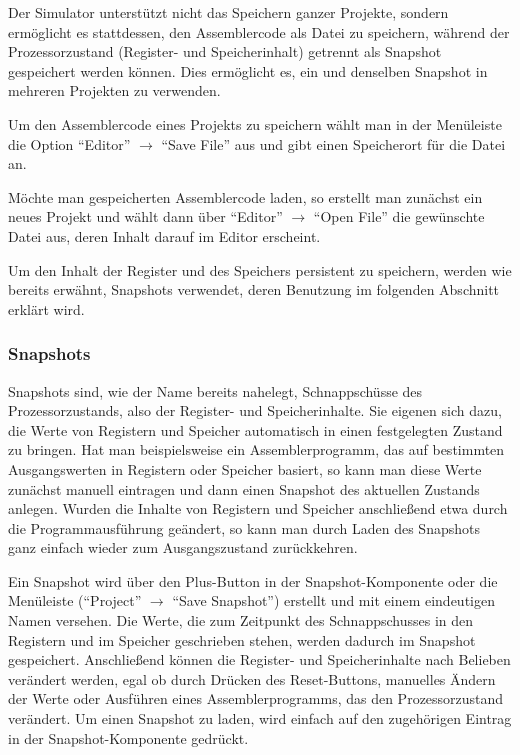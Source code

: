 Der Simulator unterstützt nicht das Speichern ganzer Projekte, sondern
ermöglicht es stattdessen, den Assemblercode als Datei zu speichern, während der
Prozessorzustand (Register- und Speicherinhalt) getrennt als Snapshot
gespeichert werden können. Dies ermöglicht es, ein und denselben Snapshot in
mehreren Projekten zu verwenden.

Um den Assemblercode eines Projekts zu speichern wählt man in der Menüleiste die
Option ``Editor'' $\rightarrow$ ``Save File'' aus und gibt einen Speicherort für
die Datei an.

Möchte man gespeicherten Assemblercode laden, so erstellt man zunächst ein neues
Projekt und wählt dann über ``Editor'' $\rightarrow$ ``Open File'' die
gewünschte Datei aus, deren Inhalt darauf im Editor erscheint.

Um den Inhalt der Register und des Speichers persistent zu speichern, werden wie
bereits erwähnt, Snapshots verwendet, deren Benutzung im folgenden Abschnitt
erklärt wird.

\subsubsection{Snapshots}

Snapshots sind, wie der Name bereits nahelegt, Schnappschüsse des
Prozessorzustands, also der Register- und Speicherinhalte. Sie eigenen sich
dazu, die Werte von Registern und Speicher automatisch in einen festgelegten
Zustand zu bringen. Hat man beispielsweise ein Assemblerprogramm, das auf
bestimmten Ausgangswerten in Registern oder Speicher basiert, so kann man diese
Werte zunächst manuell eintragen und dann einen Snapshot des aktuellen Zustands
anlegen. Wurden die Inhalte von Registern und Speicher anschließend etwa durch
die Programmausführung geändert, so kann man durch Laden des Snapshots ganz
einfach wieder zum Ausgangszustand zurückkehren.

Ein Snapshot wird über den Plus-Button in der Snapshot-Komponente oder die
Menüleiste (``Project'' $\rightarrow$ ``Save Snapshot'') erstellt und mit einem
eindeutigen Namen versehen. Die Werte, die zum Zeitpunkt des Schnappschusses in
den Registern und im Speicher geschrieben stehen, werden dadurch im Snapshot
gespeichert. Anschließend können die Register- und Speicherinhalte nach Belieben
verändert werden, egal ob durch Drücken des Reset-Buttons, manuelles Ändern der
Werte oder Ausführen eines Assemblerprogramms, das den Prozessorzustand
verändert. Um einen Snapshot zu laden, wird einfach auf den zugehörigen Eintrag
in der Snapshot-Komponente gedrückt.

